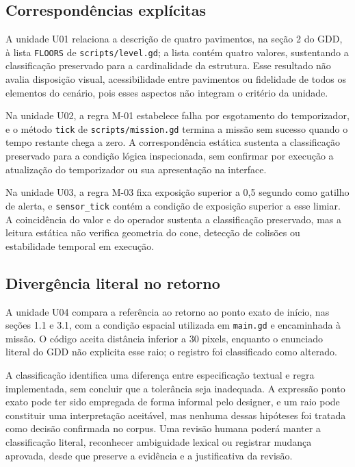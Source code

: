 \subsection{Correspondências explícitas}
A unidade U01 relaciona a descrição de quatro pavimentos, na seção 2 do GDD, à lista \texttt{FLOORS} de \texttt{scripts/level.gd}; a lista contém quatro valores, sustentando a classificação preservado para a cardinalidade da estrutura. Esse resultado não avalia disposição visual, acessibilidade entre pavimentos ou fidelidade de todos os elementos do cenário, pois esses aspectos não integram o critério da unidade.

Na unidade U02, a regra M-01 estabelece falha por esgotamento do temporizador, e o método \texttt{tick} de \texttt{scripts/mission.gd} termina a missão sem sucesso quando o tempo restante chega a zero. A correspondência estática sustenta a classificação preservado para a condição lógica inspecionada, sem confirmar por execução a atualização do temporizador ou sua apresentação na interface.

Na unidade U03, a regra M-03 fixa exposição superior a 0,5 segundo como gatilho de alerta, e \texttt{sensor\_tick} contém a condição de exposição superior a esse limiar. A coincidência do valor e do operador sustenta a classificação preservado, mas a leitura estática não verifica geometria do cone, detecção de colisões ou estabilidade temporal em execução.

\subsection{Divergência literal no retorno}
A unidade U04 compara a referência ao retorno ao ponto exato de início, nas seções 1.1 e 3.1, com a condição espacial utilizada em \texttt{main.gd} e encaminhada à missão. O código aceita distância inferior a 30 pixels, enquanto o enunciado literal do GDD não explicita esse raio; o registro foi classificado como alterado.

A classificação identifica uma diferença entre especificação textual e regra implementada, sem concluir que a tolerância seja inadequada. A expressão ponto exato pode ter sido empregada de forma informal pelo designer, e um raio pode constituir uma interpretação aceitável, mas nenhuma dessas hipóteses foi tratada como decisão confirmada no corpus. Uma revisão humana poderá manter a classificação literal, reconhecer ambiguidade lexical ou registrar mudança aprovada, desde que preserve a evidência e a justificativa da revisão.


